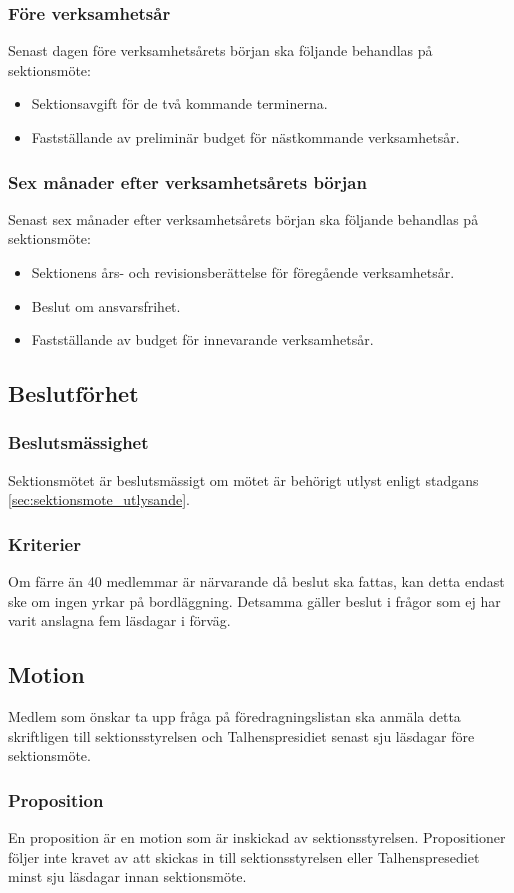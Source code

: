 \documentclass[a4paper]{dtek}
\begin{document}
\subsubsection{Före verksamhetsår}
Senast dagen före verksamhetsårets början ska följande behandlas på sektionsmöte:
\begin{itemize}
\item Sektionsavgift för de två kommande terminerna.
\item Fastställande av preliminär budget för nästkommande verksamhetsår.
\end{itemize}
\subsubsection{Sex månader efter verksamhetsårets början}
Senast sex månader efter verksamhetsårets början ska följande behandlas på sektionsmöte:
\begin{itemize}
\item Sektionens års- och revisionsberättelse för föregående verksamhetsår.
\item Beslut om ansvarsfrihet.
\item Fastställande av budget för innevarande verksamhetsår.
\end{itemize}
\subsection{Beslutförhet}
\subsubsection{Beslutsmässighet}
Sektionsmötet är beslutsmässigt om mötet är behörigt utlyst enligt stadgans \ref{sec:sektionsmote_utlysande}.
\subsubsection{Kriterier}
Om färre än 40 medlemmar är närvarande då beslut ska fattas, kan detta endast ske om ingen yrkar på bordläggning. Detsamma gäller beslut i frågor som ej har varit anslagna fem läsdagar i förväg.
\subsection{Motion}
Medlem som önskar ta upp fråga på föredragningslistan ska anmäla detta skriftligen till sektionsstyrelsen och Talhenspresidiet senast sju läsdagar före sektionsmöte.
\subsubsection{Proposition}
En proposition är en motion som är inskickad av sektionsstyrelsen.
Propositioner följer inte kravet av att skickas in till sektionsstyrelsen eller Talhenspresediet minst sju läsdagar innan sektionsmöte.
\end{document}
